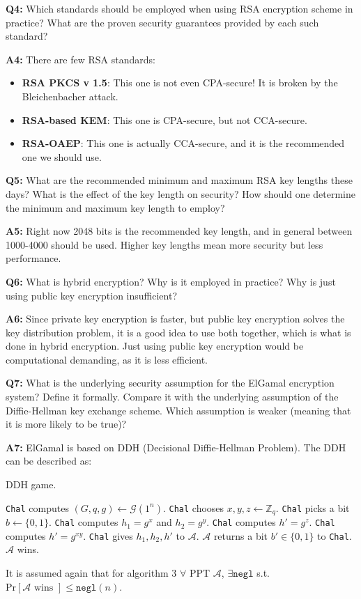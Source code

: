 \documentclass[12pt,reqno]{amsart}
\newcommand{\code}[1]{\texttt{#1}}
\newcommand{\advrs}[0]{\mathcal{A}}
\begin{document}
\vspace{20px}
\textbf{Q4:} Which standards should be employed when using RSA encryption scheme in practice? What are the proven security guarantees provided by each such standard?

\textbf{A4:} There are few RSA standards:
\begin{itemize}
\item \textbf{RSA PKCS v 1.5}: This one is not even CPA-secure! It is broken by the Bleichenbacher attack.
\item \textbf{RSA-based KEM}: This one is CPA-secure, but not CCA-secure.
\item \textbf{RSA-OAEP}: This one is actually CCA-secure, and it is the recommended one we should use.
\end{itemize}

\vspace{20px}
\textbf{Q5:} What are the recommended minimum and maximum RSA key lengths these days? What is the effect of the key length on security? How should one determine the minimum and maximum key length to employ?

\textbf{A5:} Right now 2048 bits is the recommended key length, and in general between 1000-4000 should be used. Higher key lengths mean more security but less performance. 

\vspace{20px}
\textbf{Q6:} What is hybrid encryption? Why is it employed in practice? Why is just using public key encryption insufficient?

\textbf{A6:} Since private key encryption is faster, but public key encryption solves the key distribution problem, it is a good idea to use both together, which is what is done in hybrid encryption. Just using public key encryption would be computational demanding, as it is less efficient.

\vspace{20px}
\textbf{Q7:} What is the underlying security assumption for the ElGamal encryption system? Define it formally. Compare it with the underlying assumption of the Diffie-Hellman key exchange scheme. Which assumption is weaker (meaning that it is more likely to be true)?

\textbf{A7:} ElGamal is based on DDH (Decisional Diffie-Hellman Problem). The DDH can be described as:
\begin{algorithm}
\caption{DDH game.}
\label{alg:3}
\begin{algorithmic}
\STATE \code{Chal} computes $(G, q, g) \gets \mathcal{G}(1^n)$.
\STATE \code{Chal} chooses $x, y, z \gets \mathbb{Z}_q$.
\STATE \code{Chal} picks a bit $b \gets \{0, 1\}$.
\STATE \code{Chal} computes $h_1 = g^x$ and $h_2 = g^y$.
	\STATE \code{Chal} computes $h' = g^z$.
\ELSE
	\STATE \code{Chal} computes $h' = g^{xy}$.
\ENDIF
\STATE \code{Chal} gives $h_1, h_2, h'$ to $\advrs$.
\STATE $\advrs$ returns a bit $b' \in \{0, 1\}$ to \code{Chal}.
	\STATE $\advrs$ wins.
\ENDIF
\end{algorithmic}
\end{algorithm}
It is assumed again that for algorithm 3 $\forall$ PPT $\advrs$, $\exists \code{negl}$ s.t. $\textrm{Pr}[\advrs \textrm{ wins }]\leq \code{negl}(n)$.
\end{document}
